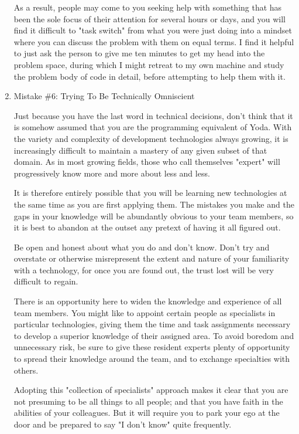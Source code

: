 \documentclass{article}
\begin{document}
\begin{enumerate}
As a result, people may come to you seeking help with something that has
been the sole focus of their attention for several hours or days, and
you will find it difficult to "task switch" from what you were just
doing into a mindset where you can discuss the problem with them on
equal terms. I find it helpful to just ask the person to give me ten
minutes to get my head into the problem space, during which I might
retreat to my own machine and study the problem body of code in detail,
before attempting to help them with it.

\item Mistake \#6: Trying To Be Technically Omniscient
\label{sec:orgheadline149}

Just because you have the last word in technical decisions, don't think
that it is somehow assumed that you are the programming equivalent of
Yoda. With the variety and complexity of development technologies always
growing, it is increasingly difficult to maintain a mastery of any given
subset of that domain. As in most growing fields, those who call
themselves "expert" will progressively know more and more about less and
less.

It is therefore entirely possible that you will be learning new
technologies at the same time as you are first applying them. The
mistakes you make and the gaps in your knowledge will be abundantly
obvious to your team members, so it is best to abandon at the outset any
pretext of having it all figured out.

Be open and honest about what you do and don't know. Don't try and
overstate or otherwise misrepresent the extent and nature of your
familiarity with a technology, for once you are found out, the trust
lost will be very difficult to regain.

There is an opportunity here to widen the knowledge and experience of
all team members. You might like to appoint certain people as
specialists in particular technologies, giving them the time and task
assignments necessary to develop a superior knowledge of their assigned
area. To avoid boredom and unnecessary risk, be sure to give these
resident experts plenty of opportunity to spread their knowledge around
the team, and to exchange specialties with others.

Adopting this "collection of specialists" approach makes it clear that
you are not presuming to be all things to all people; and that you have
faith in the abilities of your colleagues. But it will require you to
park your ego at the door and be prepared to say "I don't know" quite
frequently.


\end{enumerate}
\end{document}
